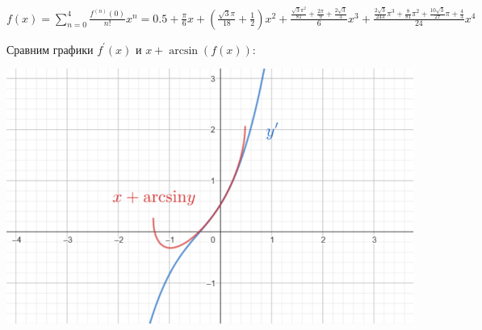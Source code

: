 $\displaystyle f(x) = \sum_{n = 0}^4 \frac{f^{(n)}(0)}{n!} x^n = 0.5 + \frac{\pi}{6}x + \left(\frac{\sqrt{3}\pi}{18} + \frac{1}{2}\right){x^2} + \frac{\frac{\sqrt{3}\pi^2}{81} + \frac{2\pi}{9} + \frac{2\sqrt{3}}{3}}{6} x^3 + \frac{\frac{2\sqrt{3}}{243}\pi^3 + \frac{8}{81}\pi^2 + \frac{10\sqrt{3}}{27} \pi + \frac{4}{3}}{24} x^4$

Сравним графики $f^\prime(x)$ и $x + \arcsin(f(x))$:

\begin{center}
    \includegraphics[height=0.45\textwidth]{images/2}
\end{center}

\clearpage

